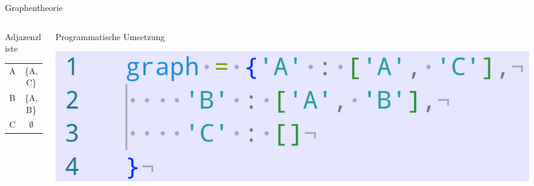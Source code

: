 \documentclass[aspectratio=169]{beamer}
\begin{document}
\begin{frame}{Graphentheorie}
    \vspace{0.5cm}
    \begin{columns}
        \begin{column}{0.5\textwidth}
            \centering \Large Adjazenzliste \normalsize
            \begin{table}[]
                \centering
                \begin{tabular}{c|c}
                    A & \{A, C\} \\
                    B & \{A, B\} \\
                    C & $\emptyset$
                \end{tabular}
            \end{table}
        \end{column}
        \begin{column}{0.5\textwidth}
            \centering \Large Programmatische Umsetzung \normalsize
            \pause
            \begin{tcolorbox}[colframe=oxfordblue, colback=blue!10, coltitle=white, title=Python]
                \includegraphics[width=\textwidth]{images/code_adjazenzliste.png}
            \end{tcolorbox}
        \end{column}
    \end{columns}
\end{frame}
\end{document}
